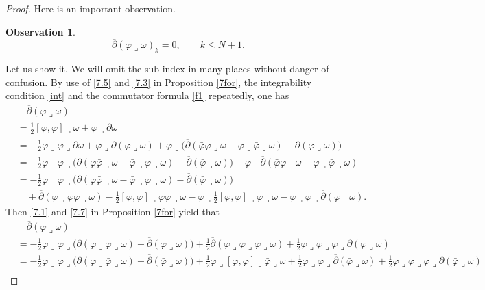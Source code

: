 \documentclass[12pt]{amsart}
\numberwithin{equation}{section}
\newtheorem{observation}  [theorem]     {Observation}
\renewcommand{\1}{\mathds{1}}
\newcommand{\db}{\overline{\partial}}
\newcommand{\lc}{\lrcorner}
\renewcommand{\>}{\rightarrow}
\newcommand{\p}{\partial}
\def\p{\partial}
\begin{document}
\begin{proof}
Here is an important observation.
\begin{observation}\label{closed}
$$\db(\varphi\lc \omega)_{k}=0,\qquad k\leq N+1.$$
\end{observation}
Let us show it. We will omit the sub-index in many places without
danger of confusion. By use of \eqref{7.5} and \eqref{7.3} in
Proposition \ref{7for}, the integrability condition \eqref{int} and
the commutator formula \eqref{f1} repeatedly, one has
\begin{align*}
&\quad \db(\varphi\lc\omega)\\ &= \frac{1}{2} [\varphi,\varphi] \lc
\omega + \varphi \lc \db \omega\\
&= - \frac{1}{2} \varphi \lc \varphi \lc \p \omega + \varphi \lc \p
( \varphi \lc \omega ) + \varphi \lc \big( \db(\bar\varphi \varphi
\lc \omega - \varphi \lc \bar \varphi \lc
\omega) - \p (\varphi \lc \omega) \big) \\
&= - \frac{1}{2} \varphi \lc \varphi \lc \big( \p (\varphi \bar
\varphi \lc \omega - \bar \varphi \lc \varphi \lc \omega ) -\db
(\bar \varphi \lc \omega)\big) + \varphi \lc \db (\bar\varphi
\varphi \lc \omega - \varphi \lc \bar \varphi \lc \omega ) \\
&= - \frac{1}{2} \varphi \lc \varphi \lc \big( \p (\varphi \bar
\varphi \lc \omega - \bar \varphi \lc \varphi \lc \omega ) -
\db (\bar \varphi \lc \omega) \big) \\
& \quad + \db (\varphi \lc \bar\varphi \varphi \lc \omega) -
\frac{1}{2} [\varphi,\varphi] \lc \bar \varphi \varphi \lc \omega -
\varphi \lc \frac{1}{2} [\varphi,\varphi] \lc \bar \varphi \lc
\omega - \varphi \lc \varphi \lc \db (\bar \varphi \lc \omega ).
\end{align*}
Then \eqref{7.1} and \eqref{7.7} in Proposition \ref{7for} yield
that
\begin{align*}
&\quad \db(\varphi\lc\omega)\\
&= - \frac{1}{2} \varphi \lc \varphi\lc \big( \p (\varphi \lc \bar
\varphi \lc \omega) + \db ( \bar \varphi \lc \omega ) \big) +
\frac{1}{2} \db (\varphi \lc \varphi \lc \bar \varphi \lc \omega) +
\frac{1}{2} \varphi \lc \varphi \lc \varphi \lc \p (\bar \varphi \lc
\omega ) \\
&= - \frac{1}{2} \varphi \lc \varphi\lc \big( \p (\varphi \lc \bar
\varphi \lc \omega) + \db ( \bar \varphi \lc \omega ) \big) +
\frac{1}{2} \varphi \lc [\varphi, \varphi] \lc \bar \varphi \lc
\omega + \frac{1}{2} \varphi \lc \varphi \lc \db (\bar \varphi \lc
\omega) + \frac{1}{2}\varphi \lc \varphi \lc \varphi \lc \p (\bar \varphi \lc \omega) \\

\end{align*}
\end{proof}
\end{document}
